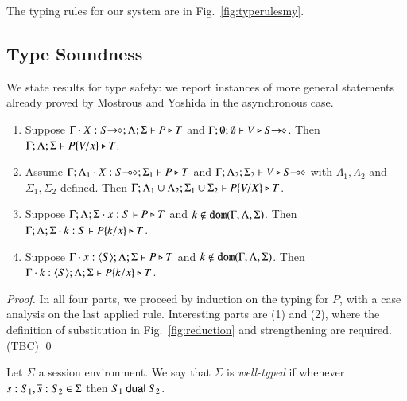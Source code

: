 


The typing rules for our system are in Fig.~\ref{fig:typerulesmy}. 

\subsection{Type Soundness}
We state results for type safety:
we report instances of more general statements already proved by Mostrous and Yoshida in the asynchronous case.

\begin{lemma}
	\begin{enumerate}[1.]
		\item	Suppose $\Gamma \cdot X:S\!\! \rightarrow\!\! \diamond; \Lambda; \Sigma  \vdash P \triangleright T$ and
			$\Gamma; \emptyset ; \emptyset  \vdash V \triangleright S\!\! \rightarrow\!\! \diamond$.
			Then $\Gamma; \Lambda; \Sigma  \vdash P\{V/x \} \triangleright T$.
	 
		\item	Assume $\Gamma; \Lambda_1 \cdot X:S\!\! \multimap\!\! \diamond; \Sigma_1  \vdash P \triangleright T$ 
			and $\Gamma; \Lambda_2; \Sigma_2  \vdash V \triangleright S\!\! \multimap\!\! \diamond$ with 
			$\Lambda_1, \Lambda_2$ and $\Sigma_1, \Sigma_2$ defined.  
			Then $\Gamma; \Lambda_1 \cup \Lambda_2; \Sigma_1 \cup \Sigma_2  \vdash P\{V/X \} \triangleright T$.

		\item	Suppose $\Gamma; \Lambda; \Sigma \cdot x:S  \vdash P \triangleright T$ and
			$k \not\in \mathtt{dom}(\Gamma, \Lambda, \Sigma)$. 
			Then $\Gamma; \Lambda; \Sigma \cdot k:S  \vdash P\{k/x \} \triangleright T$.
			
		\item	Suppose $\Gamma \cdot x:\langle S \rangle; \Lambda; \Sigma \vdash P \triangleright T$ and
			$k \not\in \mathtt{dom}(\Gamma, \Lambda, \Sigma)$. 
			Then $\Gamma \cdot k:\langle S \rangle; \Lambda; \Sigma   \vdash P\{k/x \} \triangleright T$.
	\end{enumerate}
\end{lemma}

\begin{proof}
In all four parts, we proceed by induction on the typing for $P$, with a case analysis on the last applied rule. Interesting parts are (1) and (2), where the definition of substitution in Fig.~\ref{fig:reduction} and strengthening are required. (TBC)
\qed
\end{proof}

\begin{definition}
	Let $\Sigma$ a session environment.
	We say that $\Sigma$ is {\em well-typed} if whenever
	$s: S_1, \overline{s}: S_2 \in \Sigma$ then $S_1 \ \mathsf{dual}\  S_2$.
\end{definition}

